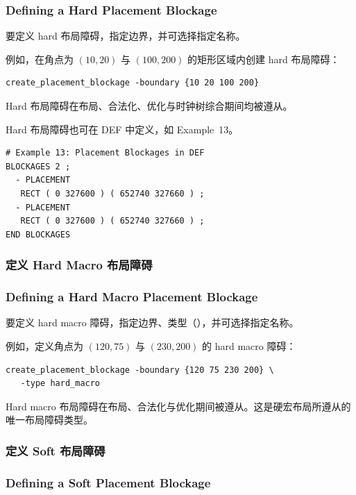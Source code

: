\subsubsection*{Defining a Hard Placement Blockage}

要定义 hard 布局障碍，指定边界，并可选择指定名称。

例如，在角点为 $(10, 20)$ 与 $(100, 200)$ 的矩形区域内创建 hard 布局障碍：
\begin{lstlisting}
create_placement_blockage -boundary {10 20 100 200}
\end{lstlisting}

\begin{noteBox}
Hard 布局障碍在布局、合法化、优化与时钟树综合期间均被遵从。
\end{noteBox}

Hard 布局障碍也可在 DEF 中定义，如 Example~13。

\begin{lstlisting}
# Example 13: Placement Blockages in DEF
BLOCKAGES 2 ;
  - PLACEMENT
   RECT ( 0 327600 ) ( 652740 327660 ) ;
  - PLACEMENT
   RECT ( 0 327600 ) ( 652740 327660 ) ;
END BLOCKAGES
\end{lstlisting}

\subsubsection{定义 Hard Macro 布局障碍}
\subsubsection*{Defining a Hard Macro Placement Blockage}

要定义 hard macro 障碍，指定边界、类型（），并可选择指定名称。

例如，定义角点为 $(120, 75)$ 与 $(230, 200)$ 的 hard macro 障碍：
\begin{lstlisting}
create_placement_blockage -boundary {120 75 230 200} \
   -type hard_macro
\end{lstlisting}

\begin{noteBox}
Hard macro 布局障碍在布局、合法化与优化期间被遵从。这是硬宏布局所遵从的唯一布局障碍类型。
\end{noteBox}

\subsubsection{定义 Soft 布局障碍}
\subsubsection*{Defining a Soft Placement Blockage}


